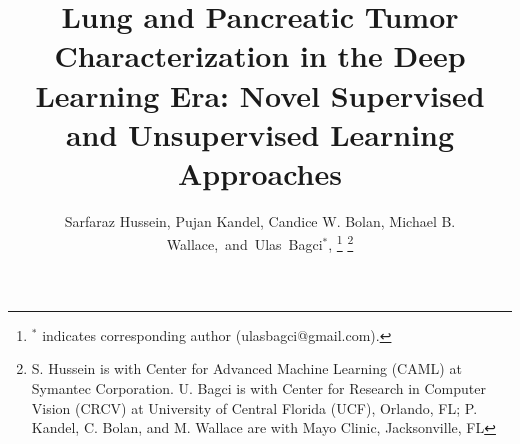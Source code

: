 \documentclass[journal]{IEEEtran}
\begin{document}
%
\title{Lung and Pancreatic Tumor Characterization in the Deep Learning Era: Novel Supervised and Unsupervised Learning Approaches }
%
%
%

\author{Sarfaraz Hussein, Pujan Kandel, Candice W. Bolan, Michael B. Wallace,~and~Ulas~Bagci$^*$, 
  \thanks{$^*$ indicates corresponding author (ulasbagci@gmail.com).}%
 \thanks{S. Hussein is with Center for Advanced Machine Learning (CAML) at Symantec Corporation. U. Bagci is with Center for Research in Computer Vision (CRCV) at University of Central Florida (UCF), Orlando, FL; P. Kandel, C. Bolan, and M. Wallace are with Mayo Clinic, Jacksonville, FL}}

\maketitle
\end{document}
